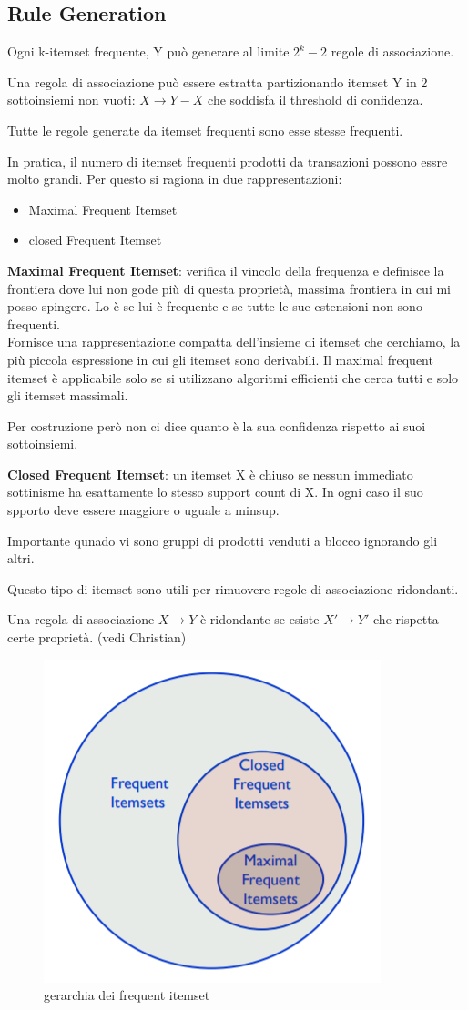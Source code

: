 \subsection{Rule Generation}
Ogni k-itemset frequente, Y pu\`o generare al limite $2^k-2$ regole di associazione. 

Una regola di associazione pu\`o essere estratta partizionando itemset Y in 2 sottoinsiemi non vuoti: $X \rightarrow Y -X$ che soddisfa il threshold di confidenza.

Tutte le regole generate da itemset frequenti sono esse stesse frequenti.

In pratica, il numero di itemset frequenti prodotti da transazioni possono essre molto grandi. Per questo si ragiona in due rappresentazioni:
\begin{itemize}
	\item Maximal Frequent Itemset
	\item closed Frequent Itemset
\end{itemize}

\textbf{Maximal Frequent Itemset}: verifica il vincolo della frequenza e definisce la frontiera dove lui non gode pi\`u di questa propriet\`a, massima frontiera in cui mi posso spingere. Lo \`e se lui \`e frequente e se tutte le sue estensioni non sono frequenti.\\
Fornisce una rappresentazione compatta dell'insieme di itemset che cerchiamo, la pi\`u piccola espressione in cui gli itemset sono derivabili. Il maximal frequent itemset \`e applicabile solo se si utilizzano algoritmi efficienti che cerca tutti e solo gli itemset massimali.

Per costruzione per\`o non ci dice quanto \`e la sua confidenza rispetto ai suoi sottoinsiemi. 

\textbf{Closed Frequent Itemset}: un itemset X \`e chiuso se nessun immediato sottinisme ha esattamente lo stesso support count di X. In ogni caso il suo spporto deve essere maggiore o uguale a minsup.

Importante qunado vi sono gruppi di prodotti venduti a blocco ignorando gli altri.

Questo tipo di itemset sono utili per rimuovere regole di associazione ridondanti. 

Una regola di associazione $X \rightarrow Y$ \`e ridondante se esiste $X' \rightarrow Y'$ che rispetta certe propriet\`a. (vedi Christian)

\begin{figure}[h!]
	\centering
	\includegraphics[height=0.45 \linewidth]{pict/itemset_freq.png}
	\caption{gerarchia dei frequent itemset}
\end{figure}

